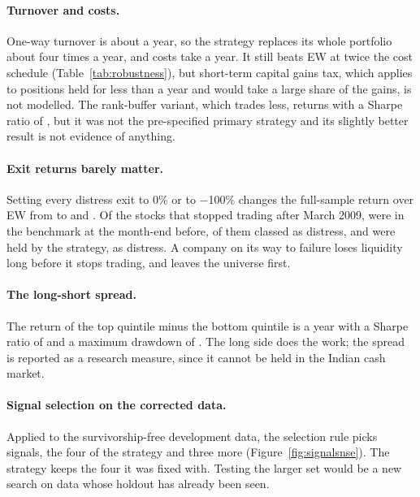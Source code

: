 \documentclass[11pt]{article}
\begin{document}
\paragraph{Turnover and costs.} One-way turnover is about \PitTurnoverFull{} a year,
so the strategy replaces its whole portfolio about four times a year, and costs take
\PitCostFull{} a year. It still beats EW
at twice the cost schedule (Table~\ref{tab:robustness}), but short-term capital gains
tax, which applies to positions held for less than a year and would take a large
share of the gains, is not modelled. The rank-buffer variant, which trades less,
returns \PitBufferCagr{} with a Sharpe ratio of \PitBufferSharpe, but it was not the
pre-specified primary strategy and its slightly better result is not evidence of
anything.

\paragraph{Exit returns barely matter.} Setting every distress exit to 0\% or to
$-$100\% changes the full-sample return over EW from \PitActiveFull{} to
\DistressZeroActiveFull{} and \DistressAllActiveFull. Of the \NExitsEval{} stocks that
stopped trading after March 2009, \NExitsInEw{} were in the benchmark at the
month-end before, \NExitsInEwDistress{} of them classed as distress, and
\NExitsInStrategy{} were held by the strategy, \NExitsInStrategyDistress{} as
distress. A company on its way to failure loses liquidity long before it stops
trading, and leaves the universe first.

\paragraph{The long-short spread.} The return of the top quintile minus the bottom
quintile is \PitSpreadCagr{} a year with a Sharpe ratio of \PitSpreadSharpe{} and a
maximum drawdown of \PitSpreadMaxDD. The long side does the work; the spread is
reported as a research measure, since it cannot be held in the Indian cash market.

\paragraph{Signal selection on the corrected data.} Applied to the survivorship-free
development data, the selection rule picks \NSelectedNse{} signals, the four of the
strategy and three more (Figure~\ref{fig:signalsnse}). The strategy keeps the
four it was fixed with. Testing the larger set would be a new search on data whose
holdout has already been seen.
\end{document}
